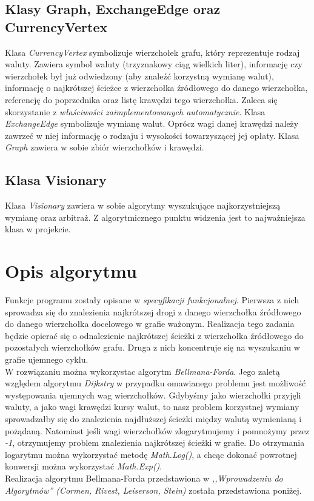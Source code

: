\documentclass[a4paper,12pt]{article}
\newcommand\tab[1][0.6cm]{\hspace*{#1}}
\begin{document}
\subsection{Klasy Graph, ExchangeEdge oraz CurrencyVertex}
\tab Klasa \textit{CurrencyVertex} symbolizuje wierzchołek grafu, który reprezentuje rodzaj waluty. Zawiera symbol waluty (trzyznakowy ciąg wielkich liter), informację czy wierzchołek był już odwiedzony (aby znaleźć korzystną wymianę walut), informację o najkrótszej ścieżce z wierzchołka źródłowego do danego wierzchołka, referencję do poprzednika oraz listę krawędzi tego wierzchołka. Zaleca się skorzystanie z \textit{właściwości zaimplementowanych automatycznie}. Klasa \textit{ExchangeEdge} symbolizuje wymianę walut. Oprócz wagi danej krawędzi należy zawrzeć w niej informację o rodzaju i wysokości towarzyszącej jej opłaty. Klasa \textit{Graph} zawiera w sobie zbiór wierzchołków i krawędzi. 

\subsection{Klasa Visionary}
\tab Klasa \textit{Visionary} zawiera w sobie algorytmy wyszukujące najkorzystniejszą wymianę oraz arbitraż. Z algorytmicznego punktu widzenia jest to najważniejsza klasa w projekcie.

\section{Opis algorytmu}
\tab Funkcje programu zostały opisane w \textit{specyfikacji funkcjonalnej}. Pierwsza z nich sprowadza się do znalezienia najkrótszej drogi z danego wierzchołka źródłowego do danego wierzchołka docelowego w grafie ważonym. Realizacja tego zadania będzie opierać się o odnalezienie najkrótszej ścieżki z wierzchołka źródłowego do pozostałych wierzchołków grafu. Druga z nich koncentruje się na wyszukaniu w grafie ujemnego cyklu. 
\\\tab W rozwiązaniu można wykorzystac algorytm \textit{Bellmana-Forda}. Jego zaletą względem algorytmu \textit{Dijkstry} w przypadku omawianego problemu jest możliwość występowania ujemnych wag wierzchołków. Gdybyśmy jako wierzchołki przyjęli waluty, a jako wagi krawędzi kursy walut, to nasz problem korzystnej wymiany sprowadzałby się do znalezienia najdłuższej ścieżki między walutą wymienianą i pożądaną. Natomiast jeśli wagi wierzchołków zlogarytmujemy i pomnożymy przez \textit{-1}, otrzymujemy problem znalezienia najkrótszej ścieżki w grafie. Do otrzymania logarytmu można wykorzystać metodę \textit{Math.Log()}, a chcąc dokonać powrotnej konwersji można wykorzystać \textit{Math.Exp()}.
\\\tab Realizacja algorytmu Bellmana-Forda przedstawiona w \textit{,,Wprowadzeniu do Algorytmów'' (Cormen, Rivest, Leiserson, Stein)} została przedstawiona poniżej.
\end{document}
